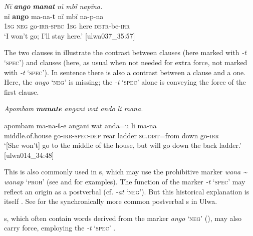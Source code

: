 \newpage

\ea%
    \label{ex:verbs:85}
          \textit{Nï} \textbf{\textit{ango}} \textbf{\textit{manat}} \textit{nï mbï napïna.}\\
\gll    nï    \textbf{ango}  ma-na-\textbf{t}    nï    mbï  na-p-na\\
    1\textsc{sg}  \textsc{neg}  go-\textsc{irr-spec}  1\textsc{sg}  here  \textsc{detr-}be-\textsc{irr}\\
\glt `I won’t go; I’ll stay here.’ [ulwa037\_35:57]
\z

The two clauses in  illustrate the contrast between   clauses (here marked with  \textit{-t} ‘\textsc{spec}’) and   clauses (here, as usual when not needed for extra  force, not marked with \textit{-t} ‘\textsc{spec}’). In sentence  there is also a contrast between a   clause and a  one. Here, the  \textit{ango} ‘\textsc{neg}’ is missing; the   \textit{-t} ‘\textsc{spec}’ alone is conveying the  force of the first clause.

\ea%
    \label{ex:verbs:86}

          \textit{Apombam} \textbf{\textit{manate}} \textit{angani wat ando li mana.}

\gll    apombam      ma-na-\textbf{t}{}-e       angani  wat    anda=u    li    ma-na\\
    middle.of.house  go-\textsc{irr-spec-dep}  rear   ladder  \textsc{sg.dist}=from    down   go-\textsc{irr}\\

 \glt ‘[She won’t] go to the middle of the house, but will go down the back ladder.’ [ulwa014\_34:48]
\z

This  is also commonly used in s, which may use the prohibitive marker \textit{wana {\textasciitilde}} \textit{wanap} ‘\textsc{proh}’ (see  and  for examples). The   function of the  marker \textit{-t} ‘\textsc{spec}’ may reflect an origin as a postverbal  (cf.  \textit{-at} ‘\textsc{neg}’). But this historical explanation is itself . See  for the synchronically more common postverbal s in Ulwa.

  s, which often contain words derived from the  marker \textit{ango} ‘\textsc{neg}’ (), may also carry  force, employing the  \textit{-t} ‘\textsc{spec}’ .

